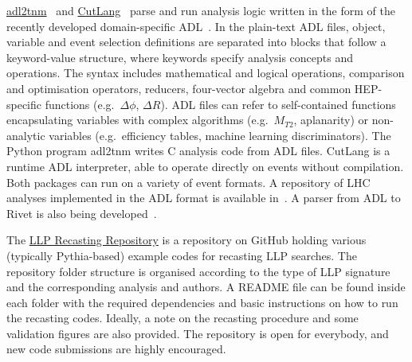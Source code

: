 \documentclass[a4paper,aps,prd,longbibliography,notitlepage,showpacs,amsmath,amssymb,superscriptaddress,nofootinbib,floatfix,11pt,preprintnumbers]{revtex4-1-mod}
\newcommand{\cxx}{\textsf{C\raisebox{0.2ex}{\smaller ++}}\xspace}
\newcommand{\python}{\textsf{Python}\xspace}
\newcommand{\rivet}{\textsf{Rivet}\xspace}
\newcommand{\adltnm}{\textsf{adl2tnm}\xspace}
\newcommand{\cutlang}{\textsf{CutLang}\xspace}
\newcommand{\pythia}{\textsf{Pythia}\xspace}
\newcommand{\eg}{e.g.\xspace}
\begin{document}
\href{https://github.com/hbprosper/adl2tnm}{\adltnm}~\cite{Brooijmans:2018xbu} and \href{https://github.com/unelg/CutLang}{\cutlang}~\cite{Sekmen:2018ehb, Unel:2019reo} parse and run analysis logic written in the form of the recently developed domain-specific ADL~\cite{Brooijmans:2016vro, Brooijmans:2020yij}. In the plain-text ADL files, object, variable and event selection definitions are separated into blocks that follow a keyword-value structure, where keywords specify analysis concepts and operations.  The syntax includes mathematical and logical operations, comparison and optimisation operators, reducers, four-vector algebra and common HEP-specific functions (\eg~$\Delta\phi$, $\Delta{R}$).  ADL files can refer to self-contained functions encapsulating variables with complex algorithms (\eg~$M_{T2}$, aplanarity) or non-analytic variables (\eg~efficiency tables, machine learning discriminators). The \python program \adltnm writes \cxx analysis code from ADL files.  \cutlang is a runtime ADL interpreter, able to operate directly on events without compilation.  Both packages can run on a variety of event formats. A repository of LHC analyses implemented in the ADL format is available in~\cite{ADL:githubrepo}. A parser from ADL to \rivet is also being developed~\cite{Brooijmans:2018xbu}.

The \href{https://github.com/llprecasting/recastingCodes}{LLP Recasting Repository} is a repository on GitHub holding various (typically \pythia-based) example codes for recasting LLP searches. The repository folder structure is organised according to the type of LLP signature and the corresponding analysis and authors. A README file can be found inside each folder with the required dependencies and basic instructions on how to run the recasting codes. Ideally, a note on the recasting procedure and some validation figures are also provided. The repository is open for everybody, and new code submissions are highly encouraged.
\end{document}
